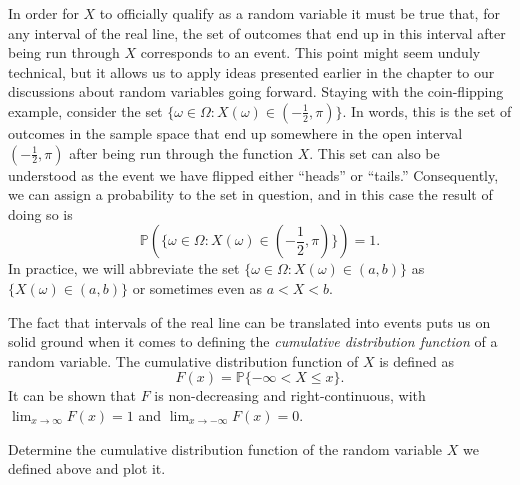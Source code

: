 \documentclass[../book.tex]{subfiles}
\begin{document}
In order for \(X\) to officially qualify as a random variable it must be true that, for any interval of the real line, the set of outcomes that end up in this interval after being run through \(X\) corresponds to an event. This point might seem unduly technical, but it allows us to apply ideas presented earlier in the chapter to our discussions about random variables going forward. Staying with the coin-flipping example, consider the set \(\{ \omega \in \Omega : X(\omega) \in (-\frac{1}{2}, \pi) \}\). In words, this is the set of outcomes in the sample space that end up somewhere in the open interval \((-\frac{1}{2}, \pi)\) after being run through the function \(X\). This set can also be understood as the event we have flipped either ``heads'' or ``tails.'' Consequently, we can assign a probability to the set in question, and in this case the result of doing so is
\begin{equation}\label{eq:rv-2}
\mathbb{P} \left( \{ \omega \in \Omega : X(\omega) \in (-\frac{1}{2}, \pi) \} \right) = 1.
\end{equation}
In practice, we will abbreviate the set \(\{ \omega \in \Omega : X(\omega) \in (a, b) \}\) as \(\{ X(\omega) \in (a, b) \}\) or sometimes even as \(a < X < b\).

The fact that intervals of the real line can be translated into events puts us on solid ground when it comes to defining the \emph{cumulative distribution function} of a random variable. The cumulative distribution function of \(X\) is defined as
\begin{equation}\label{eq:rv-3}
F(x) = \mathbb{P} \{ -\infty < X \leq x \}.
\end{equation}
It can be shown that \(F\) is non-decreasing and right-continuous, with \(\displaystyle\lim_{x\to\infty} F(x) = 1\) and \(\displaystyle\lim_{x\to-\infty} F(x) = 0\).

\begin{example} \label{eg:cdf1}
Determine the cumulative distribution function of the random variable \(X\) we defined above and plot it.
\end{example}
\end{document}
